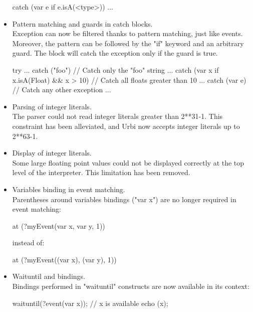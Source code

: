 \begin{itemize}
\begin{urbiunchecked}
catch (var e if e.isA(<type>))
{
  ...
}
\end{urbiunchecked}

\item Pattern matching and guards in catch blocks.\\
  Exception can now be filtered thanks to pattern matching, just like
  events. Moreover, the pattern can be followed by the "if" keyword and an
  arbitrary guard. The block will catch the exception only if the guard is
  true.

\begin{urbiunchecked}
try
{ ... }
catch ("foo") // Catch only the "foo" string
{ ... }
catch (var x if x.isA(Float) && x > 10) // Catch all floats greater than 10
{ ... }
catch (var e)  // Catch any other exception
{ ... }
\end{urbiunchecked}

\item Parsing of integer literals.\\
  The parser could not read integer literals greater than 2**31-1.  This
  constraint has been alleviated, and Urbi now accepts integer literals up
  to 2**63-1.

\item Display of integer literals.\\
  Some large floating point values could not be displayed correctly at the
  top level of the interpreter. This limitation has been removed.

\item Variables binding in event matching.\\
  Parentheses around variables bindings ("var x") are no longer required in
  event matching:

\begin{urbiunchecked}
at (?myEvent(var x, var y, 1))
\end{urbiunchecked}

\noindent
instead of:

\begin{urbiunchecked}
at (?myEvent((var x), (var y), 1))
\end{urbiunchecked}

\item Waituntil and bindings.\\
  Bindings performed in "waituntil" constructs are now available in its
  context:

\begin{urbiunchecked}
waituntil(?event(var x));
// x is available
echo (x);
\end{urbiunchecked}


\end{itemize}
